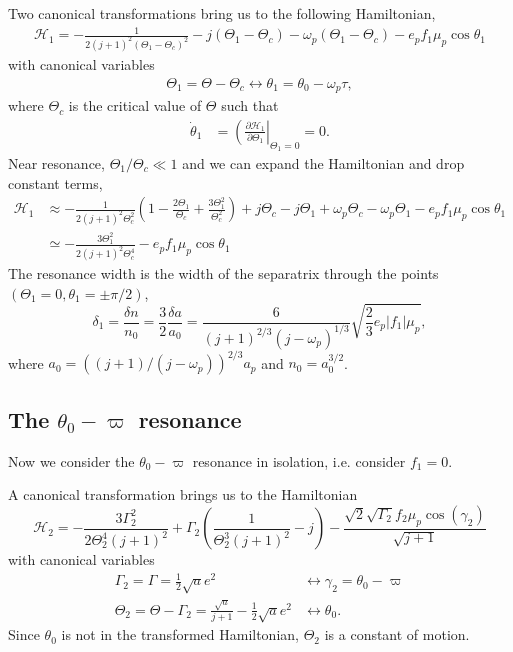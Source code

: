 \documentclass{article}
\begin{document}
Two canonical transformations bring us to the following Hamiltonian,
\begin{align}
    \mathcal H_1 = -\frac{1}{2(j+1)^2(\Theta_1-\Theta_c)^2} - j(\Theta_1-\Theta_c) - \omega_p(\Theta_1-\Theta_c) - e_pf_1\mu_p\cos\theta_1
\end{align}
with canonical variables
\begin{align}
    \Theta_1 = \Theta-\Theta_c \longleftrightarrow \theta_1=\theta_0-\omega_p\tau,
\end{align}
where $\Theta_c$ is the critical value of $\Theta$ such that
\begin{align}
    \dot\theta_1 & = \left(\frac{\partial\mathcal H_1}{\partial\Theta_1}\right|_{\Theta_1=0} = 0.
\end{align}
Near resonance, $\Theta_1/\Theta_c\ll 1$ and we can expand the Hamiltonian and drop constant terms,
\begin{align}
    \mathcal H_1 & \approx -\frac{1}{2(j+1)^2\Theta_c^2}\left(1-\frac{2\Theta_1}{\Theta_c}+\frac{3\Theta_1^2}{\Theta_c^2}\right)
    +j\Theta_c-j\Theta_1 +\omega_p\Theta_c - \omega_p\Theta_1 - e_pf_1\mu_p\cos\theta_1                                          \\
                 & \simeq -\frac{3\Theta_1^2}{2(j+1)^2\Theta_c^4} - e_pf_1\mu_p\cos\theta_1
\end{align}
The resonance width is the width of the separatrix through the points $(\Theta_1=0,\theta_1=\pm\pi/2)$,
\begin{equation}\label{eq:d1}
    \delta_1 = \frac{\delta n}{n_0} = \frac32\frac{\delta a}{a_0} = \frac{6}{(j+1)^{2/3}(j-\omega_p)^{1/3}}\sqrt{\frac23 e_p |f_1| \mu_p},
\end{equation}
where $a_0=((j+1)/(j-\omega_p))^{2/3}a_p$ and $n_0=a_0^{3/2}$.

\subsection{The $\theta_0-\varpi$ resonance}
Now we consider the $\theta_0-\varpi$ resonance in isolation, i.e. consider $f_1=0$.

A canonical transformation brings us to the Hamiltonian
\begin{equation}
    \mathcal H_2 =
    - \frac{3 \Gamma_{2}^{2}}{2 \Theta_{2}^{4} \left(j + 1\right)^{2}}
    + \Gamma_{2} \left(\frac{1}{\Theta_{2}^{3} \left(j + 1\right)^{2}}-j\right)
    - \frac{\sqrt{2} \sqrt{\Gamma_{2}} f_{2} \mu_{p} \cos{\left(\gamma_{2} \right)}}{\sqrt{j + 1}}
\end{equation}
with canonical variables
\begin{align}
    \Gamma_2 = \Gamma=\frac12\sqrt ae^2                                     & \longleftrightarrow \gamma_2 = \theta_0 -\varpi \\
    \Theta_2 = \Theta - \Gamma_2 = \frac{\sqrt a}{j+1} - \frac12\sqrt a e^2 & \longleftrightarrow \theta_0.
\end{align}
Since $\theta_0$ is not in the transformed Hamiltonian, $\Theta_2$ is a constant of motion.
\end{document}
